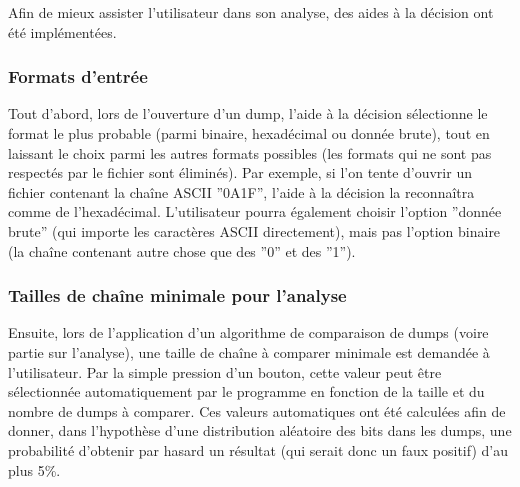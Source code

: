 Afin de mieux assister l'utilisateur dans son analyse, des aides à la décision ont été implémentées.

\subsubsection{Formats d'entrée}

Tout d'abord, lors de l'ouverture d'un dump, l'aide à la décision sélectionne le format le plus probable (parmi binaire, hexadécimal ou donnée brute), tout en laissant le choix parmi les autres formats possibles (les formats qui ne sont pas respectés par le fichier sont éliminés).
Par exemple, si l'on tente d'ouvrir un fichier contenant la chaîne ASCII ''0A1F'', l'aide à la décision la reconnaîtra comme de l'hexadécimal. L'utilisateur pourra également choisir l'option ''donnée brute'' (qui importe les caractères ASCII directement), mais pas l'option binaire (la chaîne contenant autre chose que des ''0'' et des ''1'').

\subsubsection{Tailles de chaîne minimale pour l'analyse}

Ensuite, lors de l'application d'un algorithme de comparaison de dumps (voire partie sur l'analyse), une taille de chaîne à comparer minimale est demandée à l'utilisateur. Par la simple pression d'un bouton, cette valeur peut être sélectionnée automatiquement par le programme en fonction de la taille et du nombre de dumps à comparer.
Ces valeurs automatiques ont été calculées afin de donner, dans l'hypothèse d'une distribution aléatoire des bits dans les dumps, une probabilité d'obtenir par hasard un résultat (qui serait donc un faux positif) d'au plus 5\%.

